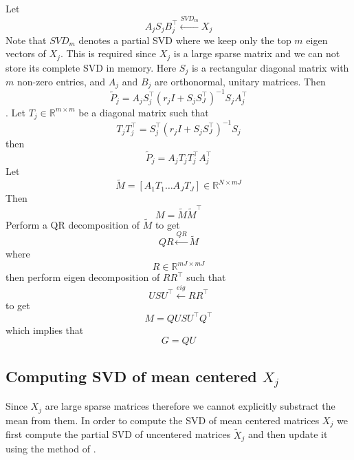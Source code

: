 \documentclass[11pt]{article}
\begin{document}
Let $$ A_{j} S_{j} B^\top_{j} \xleftarrow{SVD_{m}} X_j$$
Note that $SVD_m$ denotes a partial SVD where we keep only the top $m$ eigen
vectors of $X_j$. This is required since $X_j$ is a large sparse
matrix and we can not store its complete SVD in memory.
Here $S_j$ is a rectangular diagonal matrix with $m$ non-zero entries, 
and $A_j$ and $B_j$ are orthonormal, unitary matrices.
Then $$\widetilde{P}_j = A_j S_j^\top(r_j I + S_j S_J^\top)^{-1}S_j A_j^\top$$.
Let $T_j \in \mathbb{R}^{m \times m}$ be a diagonal matrix such that
$$T_jT_j^\top = S_j^\top(r_j I + S_j S_J^\top)^{-1}S_j $$ then
$$\widetilde{P}_j = A_j T_j T_j^\top A_j^\top$$
Let
$$\tilde{M} = \left[ A_1T_1 \ldots A_JT_J \right] \in \mathbb{R}^{N
  \times mJ}$$
Then 
$$M = \tilde{M} \tilde{M}^\top$$
Perform a QR decomposition of $\tilde{M}$ to get
$$QR \xleftarrow{QR} \tilde{M}$$ where $$R \in \mathbb{R}^{mJ \times mJ}$$
 then perform eigen decomposition of $RR^\top$ such that
$$ U S U^\top \xleftarrow{eig} RR^\top$$
to get
$$M = Q U S U^\top Q^\top$$
 which implies that
 $$G = QU$$

\subsection{Computing SVD of mean centered $X_j$}
Since $X_j$ are large sparse matrices therefore we cannot explicitly
substract the mean from them. In order to compute the SVD of mean
centered matrices $X_j$ we first compute the partial SVD of uncentered
matrices $\tilde{X}_j$ and then update it using the method of
\cite{brand2006fast}.


\end{document}
